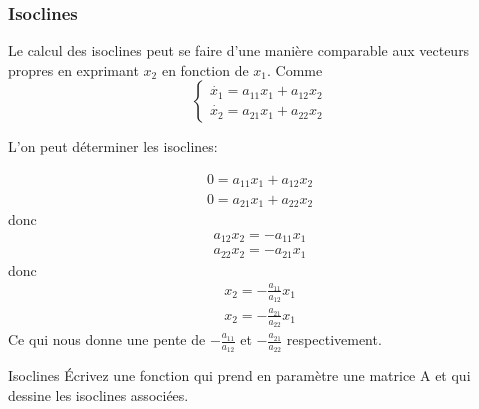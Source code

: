             \subsubsection{Isoclines}
                Le calcul des isoclines peut se faire d'une manière comparable aux vecteurs propres en exprimant $x_2$ en fonction de $x_1$.
                Comme
                \begin{equation*}
                    \begin{cases}
                        \dot{x_1} = a_{11}x_1 + a_{12} x_2\\
                        \dot{x_2} = a_{21}x_1 + a_{22} x_2
                    \end{cases}
                \end{equation*}
                
                L'on peut déterminer les isoclines:
                
                \begin{align*}
                    0 = a_{11}x_1 + a_{12} x_2\\
                    0 = a_{21}x_1 + a_{22} x_2
                \end{align*}
                donc
                \begin{align*}
                    a_{12} x_2 = -a_{11}x_1\\
                    a_{22} x_2 = -a_{21}x_1
                \end{align*}
                donc
                \begin{align*}
                    x_2 = -\frac{a_{11}}{a_{12}}x_1\\
                    x_2 = -\frac{a_{21}}{a_{22}}x_1
                \end{align*}
                Ce qui nous donne une pente de $-\frac{a_{11}}{a_{12}}$ et $-\frac{a_{21}}{a_{22}}$ respectivement.

                \begin{exercise}{Isoclines}
                    Écrivez une fonction  qui prend en paramètre une matrice A et qui dessine les isoclines associées.
                \end{exercise}
                
